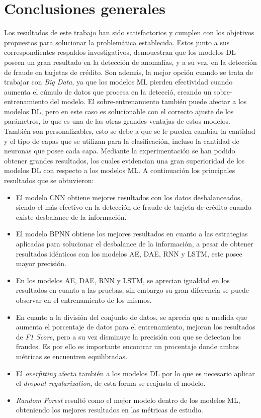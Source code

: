 \chapter*{Conclusiones generales}

Los resultados de este trabajo han sido satisfactorios y cumplen con los objetivos propuestos para solucionar la problem\'{a}tica establecida. Estos junto a sus correspondientes respaldos investigativos, demouestran que los modelos DL poseen un gran resultado en la detecci\'{o}n de anomal\'{i}as, y a su vez, en la detecci\'{o}n de fraude en tarjetas de cr\'{e}dito. Son adem\'{a}s, la mejor opci\'{o}n cuando se trata de trabajar con \textit{Big Data}, ya que los modelos ML pierden efectividad cuando aumenta el c\'{u}mulo de datos que procesa en la detecci\'{o}, creando un sobre-entrenamiento del modelo. El sobre-entrenamiento tambi\'{e}n puede afectar a los modelos DL, pero en este caso es solucionable con el correcto ajuste de los par\'{a}metros, lo que es una de las otras grandes ventajas de estos modelos. Tambi\'{e}n son personalizables, esto se debe a que se le pueden cambiar la cantidad y el tipo de capas que se utilizan para la clasificaci\'{o}n, incluso la cantidad de neuronas que posee cada capa. Mediante la experimentaci\'{o}n se han podido obtener grandes resultados, los cuales evidencian una gran superioridad de los modelos DL con respecto a los modelos ML. A continuaci\'{o}n los principales resultados que se obtuvieron:

\begin{itemize}
	\item El modelo CNN obtiene mejores resultados con los datos desbalanceados, siendo el m\'{a}s efectivo en la detecci\'{o}n de fraude de tarjeta de cr\'{e}dito cuando existe desbalance de la informaci\'{o}n.
	\item El modelo BPNN obtiene los mejores resultados en cuanto a las estrategias aplicadas para solucionar el desbalance de la informaci\'{o}n, a pesar de obtener resultados id\'{e}nticos con los modelos AE, DAE, RNN y LSTM, este posee mayor precisi\'{o}n.
	\item En los modelos AE, DAE, RNN y LSTM, se aprecian igualdad en los resultados en cuanto a las pruebas, sin embargo su gran diferencia se puede observar en el entrenamiento de los mismos.
	\item En cuanto a la divisi\'{o}n del conjunto de datos, se aprecia que a medida que aumenta el porcentaje de datos para el entrenamiento, mejoran los resultados de \textit{F1 Score}, pero a su vez disminuye la precisi\'{o}n con que se detectan los fraudes. Es por ello es importante encontrar un procentaje donde ambas m\'{e}tricas se encuentren equilibradas.
	\item El \textit{overfitting} afecta tambi\'{e}n a los modelos DL por lo que es necesario aplicar el \textit{dropout regularization}, de esta forma se reajusta el modelo.
	\item \textit{Random Forest} result\'{o} como el mejor modelo dentro de los modelos ML, obteniendo los mejores resultados en las m\'{e}tricas de estudio.
\end{itemize}

